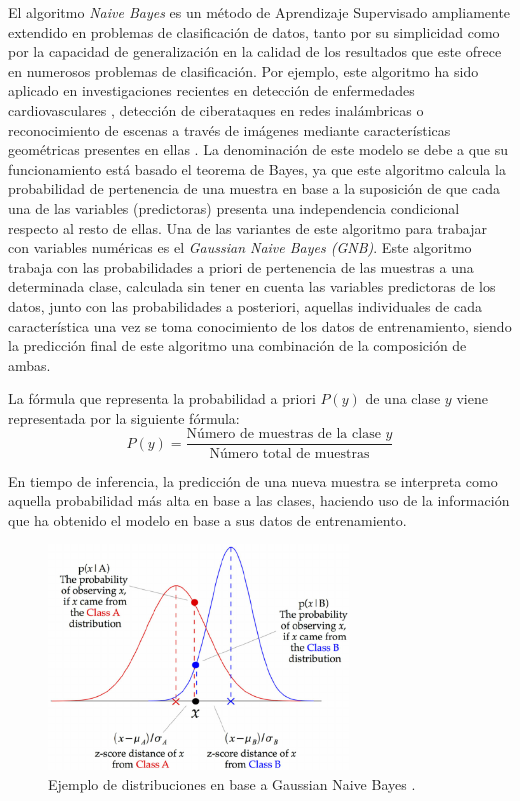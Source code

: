 El algoritmo \textit{Naive Bayes} es un método de Aprendizaje Supervisado ampliamente extendido en problemas de clasificación de datos, tanto por su simplicidad como por la capacidad de generalización en la calidad de los resultados que este ofrece en numerosos problemas de clasificación. Por ejemplo, este algoritmo ha sido aplicado en investigaciones recientes en detección de enfermedades cardiovasculares \cite{Sai_Krishna_Reddy_2022}, detección de ciberataques en redes inalámbricas \cite{9817298} o reconocimiento de escenas a través de imágenes mediante características geométricas presentes en ellas \cite{rafique2019scene}. La denominación de este modelo se debe a que su funcionamiento está basado el teorema de Bayes, ya que este algoritmo calcula la probabilidad de pertenencia de una muestra en base a la suposición de que cada una de las variables (predictoras) presenta una independencia condicional respecto al resto de ellas. Una de las variantes de este algoritmo para trabajar con variables numéricas es el \textit{Gaussian Naive Bayes (GNB)}. Este algoritmo trabaja con las probabilidades a priori de pertenencia de las muestras a una determinada clase, calculada sin tener en cuenta las variables predictoras de los datos, junto con las probabilidades a posteriori, aquellas individuales de cada característica una vez se toma conocimiento de los datos de entrenamiento, siendo la predicción final de este algoritmo una combinación de la composición de ambas.

La fórmula que representa la probabilidad a priori $P(y)$ de una clase $y$ viene representada por la siguiente fórmula:\\

\[
P(y) = \frac{\text{Número de muestras de la clase } y}{\text{Número total de muestras}}
\]



En tiempo de inferencia, la predicción de una nueva muestra se interpreta como aquella probabilidad más alta en base a las clases, haciendo uso de la información que ha obtenido el modelo en base a sus datos de entrenamiento.


\begin{figure}[H]
	\centering
	\includegraphics[width=8cm]{Figures/Background/GNB.png}
	\caption{Ejemplo de distribuciones en base a Gaussian Naive Bayes \cite{GNBIMAGE}.}
	\label{GNB_BACKGROUND}
\end{figure}


